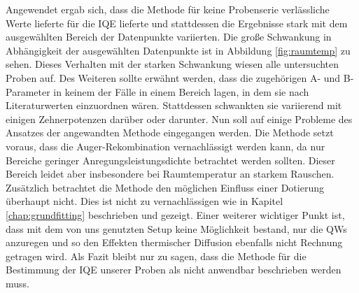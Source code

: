 \noindent 
Angewendet ergab sich, dass die Methode für keine Probenserie verlässliche Werte lieferte für die IQE lieferte und stattdessen die Ergebnisse stark mit dem ausgewählten Bereich der Datenpunkte variierten. Die große Schwankung in Abhängigkeit der ausgewählten Datenpunkte ist in Abbildung \ref{fig:raumtemp} zu sehen.
\newline
Dieses Verhalten mit der starken Schwankung wiesen alle untersuchten Proben auf. 
Des Weiteren sollte erwähnt werden, dass die zugehörigen A- und B-Parameter in keinem der Fälle in einem Bereich lagen, in dem sie nach Literaturwerten einzuordnen wären. Stattdessen schwankten sie variierend mit einigen Zehnerpotenzen darüber oder darunter. 
\newline
Nun soll auf einige Probleme des Ansatzes der angewandten Methode eingegangen werden. 
Die Methode setzt voraus, dass die Auger-Rekombination vernachlässigt werden kann, da nur Bereiche geringer Anregungsleistungsdichte betrachtet werden sollten. Dieser Bereich leidet aber insbesondere bei Raumtemperatur an starkem Rauschen. 
\newline
Zusätzlich betrachtet die Methode den möglichen Einfluss einer Dotierung überhaupt nicht. Dies ist nicht zu vernachlässigen wie in Kapitel \ref{chap:grundfitting} beschrieben und gezeigt.
\newline
Einer weiterer wichtiger Punkt ist, dass mit dem von uns genutzten Setup keine Möglichkeit bestand, nur die QWs anzuregen und so den Effekten thermischer Diffusion ebenfalls nicht Rechnung getragen wird. 
\newline
Als Fazit bleibt nur zu sagen, dass die Methode für die Bestimmung der IQE unserer Proben als nicht anwendbar beschrieben werden muss.

